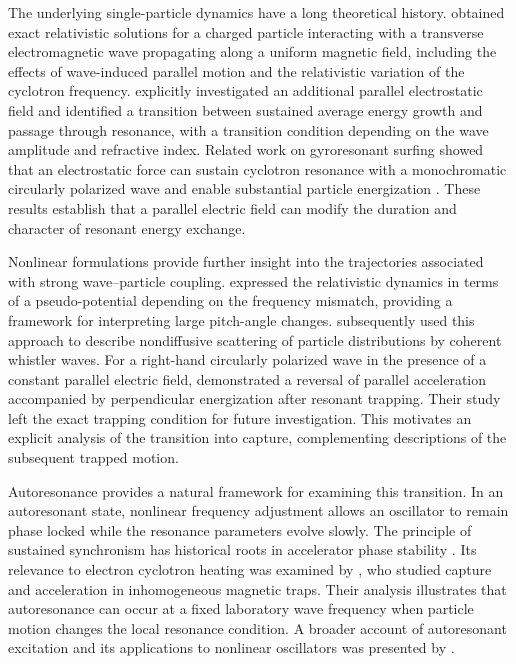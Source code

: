 \documentclass[11pt,a4paper]{article}
\begin{document}
The underlying single-particle dynamics have a long theoretical history. \citet{RobertsBuchsbaum1964} obtained exact relativistic solutions for a charged particle interacting with a transverse electromagnetic wave propagating along a uniform magnetic field, including the effects of wave-induced parallel motion and the relativistic variation of the cyclotron frequency. \citet{SchramBeukema1969} explicitly investigated an additional parallel electrostatic field and identified a transition between sustained average energy growth and passage through resonance, with a transition condition depending on the wave amplitude and refractive index. Related work on gyroresonant surfing showed that an electrostatic force can sustain cyclotron resonance with a monochromatic circularly polarized wave and enable substantial particle energization \citep{KuramitsuKrasnoselskikh2005}. These results establish that a parallel electric field can modify the duration and character of resonant energy exchange.

Nonlinear formulations provide further insight into the trajectories associated with strong wave--particle coupling. \citet{Bellan2013} expressed the relativistic dynamics in terms of a pseudo-potential depending on the frequency mismatch, providing a framework for interpreting large pitch-angle changes. \citet{YoonBellan2020} subsequently used this approach to describe nondiffusive scattering of particle distributions by coherent whistler waves. For a right-hand circularly polarized wave in the presence of a constant parallel electric field, \citet{Kang2026} demonstrated a reversal of parallel acceleration accompanied by perpendicular energization after resonant trapping. Their study left the exact trapping condition for future investigation. This motivates an explicit analysis of the transition into capture, complementing descriptions of the subsequent trapped motion.

Autoresonance provides a natural framework for examining this transition. In an autoresonant state, nonlinear frequency adjustment allows an oscillator to remain phase locked while the resonance parameters evolve slowly. The principle of sustained synchronism has historical roots in accelerator phase stability \citep{McMillan1945}. Its relevance to electron cyclotron heating was examined by \citet{NeishtadtTimofeev1987}, who studied capture and acceleration in inhomogeneous magnetic traps. Their analysis illustrates that autoresonance can occur at a fixed laboratory wave frequency when particle motion changes the local resonance condition. A broader account of autoresonant excitation and its applications to nonlinear oscillators was presented by \citet{FajansFriedland2001}.
\end{document}
